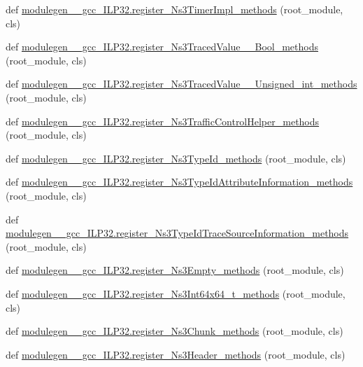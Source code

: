 \begin{DoxyCompactItemize}
def \hyperlink{namespacemodulegen____gcc__ILP32_ad4a8f9d422224c00132b21ead3c3b48a}{modulegen\+\_\+\+\_\+gcc\+\_\+\+I\+L\+P32.\+register\+\_\+\+Ns3\+Timer\+Impl\+\_\+methods} (root\+\_\+module, cls)
\item 
def \hyperlink{namespacemodulegen____gcc__ILP32_a2cf2e208ddaa7b7477da3f3d8530c8a1}{modulegen\+\_\+\+\_\+gcc\+\_\+\+I\+L\+P32.\+register\+\_\+\+Ns3\+Traced\+Value\+\_\+\+\_\+\+Bool\+\_\+methods} (root\+\_\+module, cls)
\item 
def \hyperlink{namespacemodulegen____gcc__ILP32_ab83b32b8387dfc69dc0c01e4c77b063d}{modulegen\+\_\+\+\_\+gcc\+\_\+\+I\+L\+P32.\+register\+\_\+\+Ns3\+Traced\+Value\+\_\+\+\_\+\+Unsigned\+\_\+int\+\_\+methods} (root\+\_\+module, cls)
\item 
def \hyperlink{namespacemodulegen____gcc__ILP32_a72909d24b01f4e5460267f0a28303044}{modulegen\+\_\+\+\_\+gcc\+\_\+\+I\+L\+P32.\+register\+\_\+\+Ns3\+Traffic\+Control\+Helper\+\_\+methods} (root\+\_\+module, cls)
\item 
def \hyperlink{namespacemodulegen____gcc__ILP32_a6436195ea7813af4a6f5611bac15066d}{modulegen\+\_\+\+\_\+gcc\+\_\+\+I\+L\+P32.\+register\+\_\+\+Ns3\+Type\+Id\+\_\+methods} (root\+\_\+module, cls)
\item 
def \hyperlink{namespacemodulegen____gcc__ILP32_afa4c5c57202d38b0cdfa0d7fd58b5797}{modulegen\+\_\+\+\_\+gcc\+\_\+\+I\+L\+P32.\+register\+\_\+\+Ns3\+Type\+Id\+Attribute\+Information\+\_\+methods} (root\+\_\+module, cls)
\item 
def \hyperlink{namespacemodulegen____gcc__ILP32_a839bc77808351c50cde37c45869c9ac2}{modulegen\+\_\+\+\_\+gcc\+\_\+\+I\+L\+P32.\+register\+\_\+\+Ns3\+Type\+Id\+Trace\+Source\+Information\+\_\+methods} (root\+\_\+module, cls)
\item 
def \hyperlink{namespacemodulegen____gcc__ILP32_aaaf5b4399b80410455abaa6263f1cd29}{modulegen\+\_\+\+\_\+gcc\+\_\+\+I\+L\+P32.\+register\+\_\+\+Ns3\+Empty\+\_\+methods} (root\+\_\+module, cls)
\item 
def \hyperlink{namespacemodulegen____gcc__ILP32_a162a098f5d929c52ad2e6c3ed1f54204}{modulegen\+\_\+\+\_\+gcc\+\_\+\+I\+L\+P32.\+register\+\_\+\+Ns3\+Int64x64\+\_\+t\+\_\+methods} (root\+\_\+module, cls)
\item 
def \hyperlink{namespacemodulegen____gcc__ILP32_acca0b09c03a65420f803907cd64df814}{modulegen\+\_\+\+\_\+gcc\+\_\+\+I\+L\+P32.\+register\+\_\+\+Ns3\+Chunk\+\_\+methods} (root\+\_\+module, cls)
\item 
def \hyperlink{namespacemodulegen____gcc__ILP32_aa49e4221854466e73c3442d993373495}{modulegen\+\_\+\+\_\+gcc\+\_\+\+I\+L\+P32.\+register\+\_\+\+Ns3\+Header\+\_\+methods} (root\+\_\+module, cls)

\end{DoxyCompactItemize}
